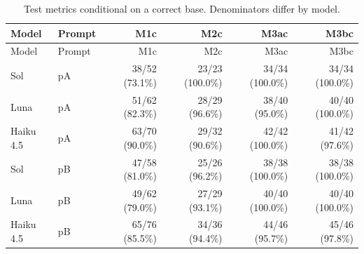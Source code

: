 \begingroup\small\setlength{\tabcolsep}{4pt}
\begin{longtable}{llrrrr}
\caption{Test metrics conditional on a correct base. Denominators differ by model.}\\
\toprule
Model & Prompt & M1c & M2c & M3ac & M3bc \\
\midrule\endfirsthead
\toprule
Model & Prompt & M1c & M2c & M3ac & M3bc \\
\midrule\endhead
\bottomrule\endfoot
Sol & pA & 38/52 (73.1\%) & 23/23 (100.0\%) & 34/34 (100.0\%) & 34/34 (100.0\%) \\
Luna & pA & 51/62 (82.3\%) & 28/29 (96.6\%) & 38/40 (95.0\%) & 40/40 (100.0\%) \\
Haiku 4.5 & pA & 63/70 (90.0\%) & 29/32 (90.6\%) & 42/42 (100.0\%) & 41/42 (97.6\%) \\
Sol & pB & 47/58 (81.0\%) & 25/26 (96.2\%) & 38/38 (100.0\%) & 38/38 (100.0\%) \\
Luna & pB & 49/62 (79.0\%) & 27/29 (93.1\%) & 40/40 (100.0\%) & 40/40 (100.0\%) \\
Haiku 4.5 & pB & 65/76 (85.5\%) & 34/36 (94.4\%) & 44/46 (95.7\%) & 45/46 (97.8\%) \\
\end{longtable}\endgroup


